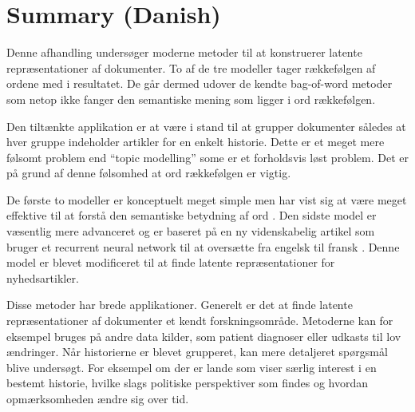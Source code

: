 \chapter{Summary (Danish)}

Denne afhandling undersøger moderne metoder til at konstruerer latente repræsentationer af dokumenter. To af de tre modeller tager rækkefølgen af ordene med i resultatet. De går dermed udover de kendte bag-of-word metoder som netop ikke fanger den semantiske mening som ligger i ord rækkefølgen. 

Den tiltænkte applikation er at være i stand til at grupper dokumenter således at hver gruppe indeholder artikler for en enkelt historie. Dette er et meget mere følsomt problem end ``topic modelling'' some er et forholdsvis løst problem. Det er på grund af denne følsomhed at ord rækkefølgen er vigtig.

De første to modeller er konceptuelt meget simple men har vist sig at være meget effektive til at forstå den semantiske betydning af ord \cite{word2vec-details, doc2vec}. Den sidste model er væsentlig mere advanceret og er baseret på en ny videnskabelig artikel som bruger et recurrent neural network til at oversætte fra engelsk til fransk \cite{sutskever}. Denne model er blevet modificeret til at finde latente repræsentationer for nyhedsartikler.

Disse metoder har brede applikationer. Generelt er det at finde latente repræsentationer af dokumenter et kendt forskningsområde. Metoderne kan for eksempel bruges på andre data kilder, som patient diagnoser eller udkasts til lov ændringer.
Når historierne er blevet grupperet, kan mere detaljeret spørgsmål blive undersøgt. For eksempel om der er lande som viser særlig interest i en bestemt historie, hvilke slags politiske perspektiver som findes og hvordan opmærksomheden ændre sig over tid.
